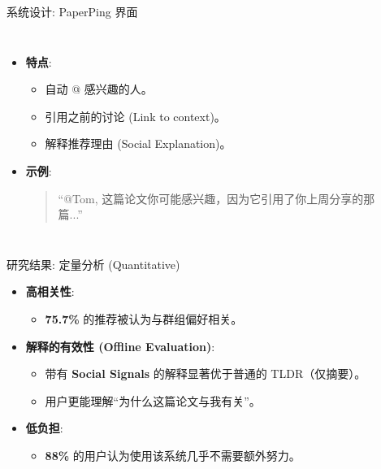 \documentclass[aspectratio=169]{beamer}
\begin{document}
\begin{frame}{系统设计: PaperPing 界面}
    \begin{columns}
        \begin{itemize}
            \item \textbf{特点}:
            \begin{itemize}
                \item 自动 @ 感兴趣的人。
                \item 引用之前的讨论 (Link to context)。
                \item 解释推荐理由 (Social Explanation)。
            \end{itemize}
            \vspace{0.5cm}
            \item \textbf{示例}:
            \begin{quote}
                ``@Tom, 这篇论文你可能感兴趣，因为它引用了你上周分享的那篇...''
            \end{quote}
        \end{itemize}
        
        \begin{center}
        \end{center}
    \end{columns}
\end{frame}

\begin{frame}{研究结果: 定量分析 (Quantitative)}
    \begin{itemize}
        \item \textbf{高相关性}: 
        \begin{itemize}
            \item \textbf{75.7\%} 的推荐被认为与群组偏好相关。
        \end{itemize}
        \vspace{0.5cm}
        \item \textbf{解释的有效性 (Offline Evaluation)}: 
        \begin{itemize}
            \item 带有 \textbf{Social Signals} 的解释显著优于普通的 TLDR（仅摘要）。
            \item 用户更能理解“为什么这篇论文与我有关”。
        \end{itemize}
        \vspace{0.5cm}
        \item \textbf{低负担}: 
        \begin{itemize}
            \item \textbf{88\%} 的用户认为使用该系统几乎不需要额外努力。
        \end{itemize}
    \end{itemize}
\end{frame}
\end{document}

